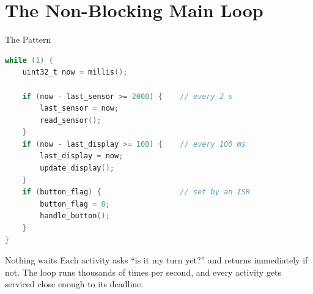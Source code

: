 \documentclass[9pt,aspectratio=169,xcolor=table]{beamer}
\begin{document}
\section{The Non-Blocking Main Loop}

\begin{frame}[fragile]{The Pattern}
\begin{lstlisting}[language=C, basicstyle=\ttfamily\scriptsize]
while (1) {
    uint32_t now = millis();

    if (now - last_sensor >= 2000) {    // every 2 s
        last_sensor = now;
        read_sensor();
    }
    if (now - last_display >= 100) {    // every 100 ms
        last_display = now;
        update_display();
    }
    if (button_flag) {                  // set by an ISR
        button_flag = 0;
        handle_button();
    }
}
\end{lstlisting}

    \vspace{2mm}
    \begin{block}{Nothing waits}
        Each activity asks ``is it my turn yet?'' and returns immediately if not.
        The loop runs thousands of times per second, and every activity gets
        serviced \alert{close enough} to its deadline.
    \end{block}
\end{frame}
\end{document}
